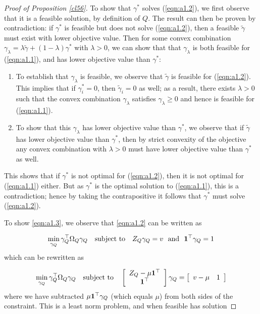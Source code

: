 \begin{proof}[Proof of Proposition \ref{cl56}]

    To show that $\gamma^*$ solves (\ref{eqn:a1.2}), we first observe that it is a feasible solution, by definition of $Q$. The result can then be proven by contradiction: if $\gamma^*$ is feasible but does not solve (\ref{eqn:a1.2}), then a feasible $\tilde{\gamma}$ must exist with lower objective value. Then for some convex combination $\gamma_\lambda = \lambda \tilde{\gamma} + (1-\lambda)\gamma^*$ with $\lambda > 0$, we can show that that $\gamma_\lambda$ is both feasible for (\ref{eqn:a1.1}), and has lower objective value than $\gamma^*$:
    \begin{enumerate}
        \item     To establish that $\gamma_\lambda$ is feasible, we observe that $\tilde{\gamma}$ is feasible for (\ref{eqn:a1.2}). This implies that if $\gamma^*_i=0$, then $\tilde{\gamma}_i=0$ as well; as a result, there exists $\lambda > 0$ such that the convex combination $\gamma_\lambda$ satisfies $\gamma_\lambda \geq 0$ and hence is feasible for (\ref{eqn:a1.1}).
    \item     To show that this $\gamma_\lambda$ has lower objective value than $\gamma^*$, we observe that if $\tilde{\gamma}$ has lower objective value than $\gamma^*$, then by strict convexity of the objective any convex combination with $\lambda > 0$ must have lower objective value than $\gamma^*$ as well.
    \end{enumerate}
    This shows that if $\gamma^*$ is not optimal for (\ref{eqn:a1.2}), then it is not optimal for (\ref{eqn:a1.1}) either. But as $\gamma^*$ is the optimal solution to (\ref{eqn:a1.1}), this is a contradiction; hence by taking the contrapositive it follows that $\gamma^*$ must solve (\ref{eqn:a1.2}).
    
To show \eqref{eqn:a1.3}, we observe that \eqref{eqn:a1.2} can be written as

\[ \min_{\gamma_Q} \gamma_Q^\top \Omega_Q \gamma_Q \quad \text{subject to} \quad Z_Q \gamma_Q = v \ \text{ and } \ {\bf 1}^\top \gamma_Q = 1\] 
which can be rewritten as

\[ \min_{\gamma_Q} \gamma_Q^\top \Omega_Q \gamma_Q \quad \text{subject to} \quad \left[ \begin{array}{cr} Z_Q - \mu {\bf 1}^\top\\ {\bf 1}^\top \end{array}\right] \gamma_Q = \left[\begin{array}{cr} v - \mu & 1 \end{array}\right]\] 
where we have subtracted $\mu{\bf 1}^\top \gamma_Q$ (which equals $\mu$) from both sides of the constraint. This is a least norm problem, and when feasible has solution


\end{proof}
